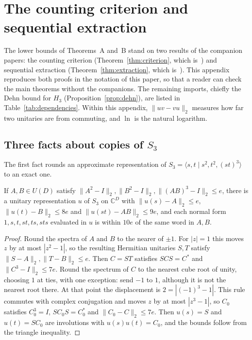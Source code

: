 \section{The counting criterion and sequential extraction}\label{app:imported}

The lower bounds of Theorems~A and~B stand on two results of the companion papers: the counting criterion
(Theorem~\ref{thm:criterion}, which is~\cite[Theorem~8.1]{DouglasMghirbiA}) and sequential extraction (Theorem~\ref{thm:extraction},
which is~\cite[Theorem~5.2]{DouglasMghirbiB}). This appendix reproduces both proofs in the notation of this paper, so that a reader can check
the main theorems without the companions. The remaining imports, chiefly the Dehn bound for $H_3$ (Proposition~\ref{prop:dehn}), are listed in
Table~\ref{tab:dependencies}. Within this appendix, $\|uv-vu\|_2$ measures how far two unitaries are from commuting, and $\ln$ is the natural
logarithm.

\subsection{Three facts about copies of \texorpdfstring{$S_3$}{S3}}

The first fact rounds an approximate representation of $S_3=\langle s,t\mid s^2,t^2,(st)^3\rangle$ to an exact one.

\begin{lemma}\label{lem:imp-s3round}
If $A,B\in U(D)$ satisfy $\|A^2-I\|_2,\|B^2-I\|_2,\|(AB)^3-I\|_2\le e$, there is a unitary representation $u$ of $S_3$ on $\mathbb C^D$
with $\|u(s)-A\|_2\le e$, $\|u(t)-B\|_2\le8e$ and $\|u(st)-AB\|_2\le9e$, and each normal form $1,s,t,st,ts,sts$ evaluated in $u$ is within $10e$
of the same word in $A,B$.
\end{lemma}

\begin{proof}
Round the spectra of $A$ and $B$ to the nearer of $\pm1$. For $|z|=1$ this moves $z$ by at most $|z^2-1|$, so the resulting Hermitian unitaries
$S,T$ satisfy $\|S-A\|_2,\|T-B\|_2\le e$. Then $C=ST$ satisfies $SCS=C^*$ and $\|C^3-I\|_2\le7e$. Round the spectrum of $C$ to the nearest cube root
of unity, choosing $1$ at ties, with one exception: send $-1$ to $1$, although it is not the nearest root there. At that point the
displacement is $2=|(-1)^3-1|$. This rule commutes with complex conjugation and moves $z$ by at most $|z^3-1|$, so $C_0$ satisfies $C_0^3=I$,
$SC_0S=C_0^*$ and $\|C_0-C\|_2\le7e$. Then $u(s)=S$ and $u(t)=SC_0$ are involutions with $u(s)u(t)=C_0$, and the bounds follow from the triangle
inequality.
\end{proof}

